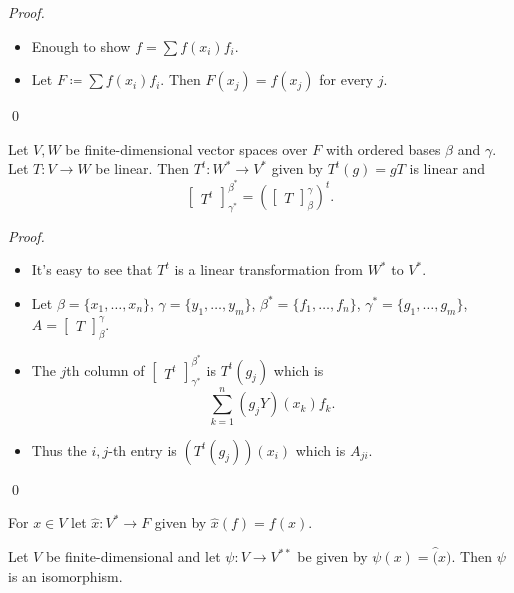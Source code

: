\documentclass[12pt]{article}
\newenvironment{theorem}[2][Theorem]{\begin{trivlist}
\item[\hskip \labelsep {\bfseries #1}\hskip \labelsep {\bfseries #2.}]}{\end{trivlist}}
\newenvironment{sol}
    {\emph{Proof.}
    }
    {
    \qed
    }
\begin{document}
\begin{sol}
\begin{itemize}
    \item Enough to show $f = \sum f(x_i)f_i$.
    
    \item Let $F \coloneqq \sum f(x_i)f_i$. Then $F(x_j) = f(x_j)$ for every $j$.
\end{itemize}
\end{sol}

\begin{theorem}{2.25}
Let $V, W$ be finite-dimensional vector spaces over $F$ with ordered bases $\beta$ and $\gamma$. Let $T : V \to W$ be linear. Then $T^t : W^* \to V^*$ given by $T^t(g) = gT$ is linear and $$\begin{bmatrix} T^t \end{bmatrix}_{\gamma^*}^{\beta^*} = (\begin{bmatrix} T \end{bmatrix}_\beta^\gamma)^t.$$
\end{theorem}

\begin{sol}
\begin{itemize}
    \item It's easy to see that $T^t$ is a linear transformation from $W^*$ to $V^*$.
    
    \item Let $\beta = \{x_1, \dots, x_n\}$, $\gamma = \{y_1, \dots, y_m\}$, $\beta^* = \{f_1, \dots, f_n\}$, $\gamma^* = \{g_1, \dots, g_m\}$, $A = \begin{bmatrix} T \end{bmatrix}_\beta^\gamma$.
    
    \item The $j$th column of $\begin{bmatrix} T^t \end{bmatrix}_{\gamma^*}^{\beta^*}$ is $T^t(g_j)$ which is $$\sum_{k = 1}^n (g_jY)(x_k)f_k.$$
    
    \item Thus the $i, j$-th entry is $(T^t(g_j))(x_i)$ which is $A_{ji}$.
\end{itemize}
\end{sol}

For $x \in V$ let $\hat{x} : V^* \to F$ given by $\hat{x}(f) = f(x)$.

\begin{theorem}{2.26}
Let $V$ be finite-dimensional and let $\psi : V \to V^{**}$ be given by $\psi(x) = \hat(x)$. Then $\psi$ is an isomorphism.
\end{theorem}
\end{document}
